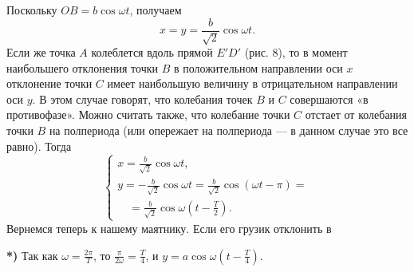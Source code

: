 \documentclass{article}
\begin{document}
\begin{multicols}{2}
Поскольку $OB = b \cos \omega t$, получаем
\[
x = y = \frac{b}{\sqrt{2}} \cos \omega t. \tag{3}
\]
Если же точка $A$ колеблется вдоль прямой $E'D'$ (рис. 8), то в момент наибольшего отклонения точки $B$ в положительном направлении оси $x$ отклонение точки $C$ имеет наибольшую величину в отрицательном направлении оси $y$. В этом случае говорят, что колебания точек $B$ и $C$ совершаются «в противофазе». Можно считать также, что колебание точки $C$ отстает от колебания точки $B$ на полпериода (или опережает на полпериода — в данном случае это все равно). Тогда
\[
\begin{cases}
x = \frac{b}{\sqrt{2}} \cos \omega t, \\
y = -\frac{b}{\sqrt{2}} \cos \omega t = \frac{b}{\sqrt{2}} \cos (\omega t - \pi) = \\
\quad = \frac{b}{\sqrt{2}} \cos \omega \left(t - \frac{T}{2}\right).
\end{cases}
\tag{4}
\]
Вернемся теперь к нашему маятнику. Если его грузик отклонить в

\begin{flushleft}
{\small \textbf{*)} Так как $\omega = \frac{2\pi}{T}$, то $\frac{\pi}{2\omega} = \frac{T}{4}$, и $y = a \cos \omega \left(t - \frac{T}{4}\right)$.}


\end{flushleft}

\end{multicols}
\end{document}
